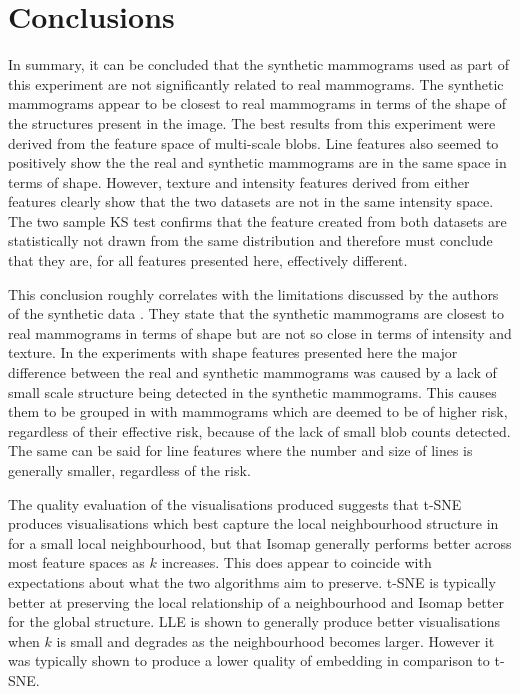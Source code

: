 \section{Conclusions}
In summary, it can be concluded that the synthetic mammograms used as part of this experiment are not significantly related to real mammograms. The synthetic mammograms appear to be closest to real mammograms in terms of the shape of the structures present in the image. The best results from this experiment were derived from the feature space of multi-scale blobs. Line features also seemed to positively show the the real and synthetic mammograms are in the same space in terms of shape. However, texture and intensity features derived from either features clearly show that the two datasets are not in the same intensity space. The two sample KS test confirms that the feature created from both datasets are statistically not drawn from the same distribution and therefore must conclude that they are, for all features presented here, effectively different.

This conclusion roughly correlates with the limitations discussed by the authors of the synthetic data \cite{bakic2002mammogram1, bakic2002mammogram2, bakic2003mammogram3}. They state that the synthetic mammograms are closest to real mammograms in terms of shape but are not so close in terms of intensity and texture. In the experiments with shape features presented here the major difference between the real and synthetic mammograms was caused by a lack of small scale structure being detected in the synthetic mammograms. This causes them to be grouped in with mammograms which are deemed to be of higher risk, regardless of their effective risk, because of the lack of small blob counts detected. The same can be said for line features where the number and size of lines is generally smaller, regardless of the risk.

The quality evaluation of the visualisations produced suggests that t-SNE produces visualisations which best capture the local neighbourhood structure in for a small local neighbourhood, but that Isomap generally performs better across most feature spaces as $k$ increases. This does appear to coincide with expectations about what the two algorithms aim to preserve. t-SNE is typically better at preserving the local relationship of a neighbourhood and Isomap better for the global structure. LLE is shown to generally produce better visualisations when $k$ is small and degrades as the neighbourhood becomes larger. However it was typically shown to produce a lower quality of embedding in comparison to t-SNE.


